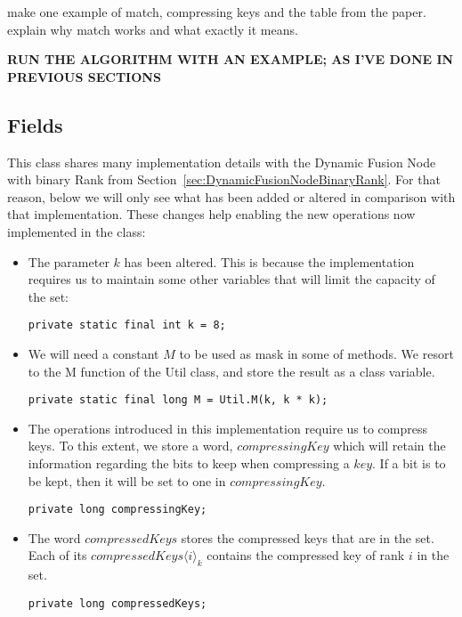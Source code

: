 make one example of match, compressing keys and the table from the paper. explain why match works and what exactly it means.


\textbf{RUN THE ALGORITHM WITH AN EXAMPLE; AS I'VE DONE IN PREVIOUS SECTIONS}

\subsection{Fields}

This class shares many implementation details with the Dynamic Fusion Node with binary Rank from Section~\ref{sec:DynamicFusionNodeBinaryRank}. For that reason, below we will only see what has been added or altered in comparison with that implementation. These changes help enabling the new operations now implemented in the class:
\begin{itemize}
    \item
    The parameter $k$ has been altered. This is because the implementation requires us to maintain some other variables that will limit the capacity of the set:
    \begin{lstlisting}
private static final int k = 8;
    \end{lstlisting}
    
    \item
    We will need a constant $M$ to be used as mask in some of methods. We resort to the {\ttfamily M} function of the {\ttfamily Util} class, and store the result as a class variable. 
    \begin{lstlisting}
private static final long M = Util.M(k, k * k);
    \end{lstlisting}

    \item
    The operations introduced in this implementation require us to compress keys. To this extent, we store a word, $compressingKey$ which will retain the information regarding the bits to keep when compressing a $key$. If a bit is to be kept, then it will be set to one in $compressingKey$.
    \begin{lstlisting}
private long compressingKey;
    \end{lstlisting}
    
    \item
    The word $compressedKeys$ stores the compressed keys that are in the set. Each of its $compressedKeys\langle i \rangle_k$ contains the compressed key of rank $i$ in the set.
    \begin{lstlisting}
private long compressedKeys;
    \end{lstlisting}


\end{itemize}

